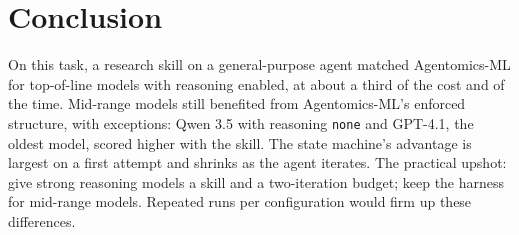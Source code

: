 \section{Conclusion}\label{sec:conclusion}

On this task, a research skill on a general-purpose agent matched Agentomics-ML for top-of-line models with reasoning
enabled, at about a third of the cost and of the time. Mid-range models still benefited from Agentomics-ML's
enforced structure, with exceptions: Qwen 3.5 with reasoning \texttt{none} and GPT-4.1, the oldest model, scored higher with the
skill. The state machine's advantage is largest on a first attempt and shrinks as the agent iterates.  The practical upshot:
give strong reasoning models a skill and a two-iteration budget; keep the harness for mid-range models.
Repeated runs per configuration would firm up these
differences.
